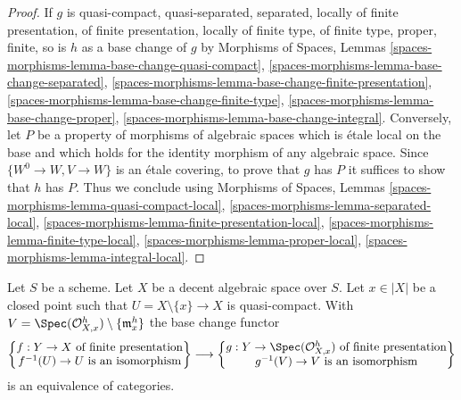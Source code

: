 \begin{proof}
If $g$ is quasi-compact, quasi-separated, separated, locally of finite
presentation, of finite presentation, locally of finite type, of finite type,
proper, finite, so is $h$ as a base change of $g$ by
Morphisms of Spaces, Lemmas
\ref{spaces-morphisms-lemma-base-change-quasi-compact},
\ref{spaces-morphisms-lemma-base-change-separated},
\ref{spaces-morphisms-lemma-base-change-finite-presentation},
\ref{spaces-morphisms-lemma-base-change-finite-type},
\ref{spaces-morphisms-lemma-base-change-proper},
\ref{spaces-morphisms-lemma-base-change-integral}.
Conversely, let $P$ be a property of morphisms of algebraic
spaces which is \'etale local on the base and which holds for
the identity morphism of any algebraic space.
Since $\{W^0 \to W, V \to W\}$ is an \'etale
covering, to prove that $g$ has $P$ it suffices to show
that $h$ has $P$. Thus we conclude using
Morphisms of Spaces, Lemmas
\ref{spaces-morphisms-lemma-quasi-compact-local},
\ref{spaces-morphisms-lemma-separated-local},
\ref{spaces-morphisms-lemma-finite-presentation-local},
\ref{spaces-morphisms-lemma-finite-type-local},
\ref{spaces-morphisms-lemma-proper-local},
\ref{spaces-morphisms-lemma-integral-local}.
\end{proof}

\begin{lemma}
\label{lemma-modifications}
Let $S$ be a scheme. Let $X$ be a decent algebraic space over $S$.
Let $x \in |X|$ be a closed point such that $U = X \setminus \{x\} \to X$
is quasi-compact. With
$V = \Spec(\mathcal{O}_{X, x}^h) \setminus \{\mathfrak m_x^h\}$
the base change functor
$$
\left\{
\begin{matrix}
f : Y \to X\text{ of finite presentation} \\
f^{-1}(U) \to U\text{ is an isomorphism}
\end{matrix}
\right\}
\longrightarrow
\left\{
\begin{matrix}
g : Y \to \Spec(\mathcal{O}_{X, x}^h)\text{ of finite presentation} \\
g^{-1}(V) \to V\text{ is an isomorphism}
\end{matrix}
\right\}
$$
is an equivalence of categories.
\end{lemma}

